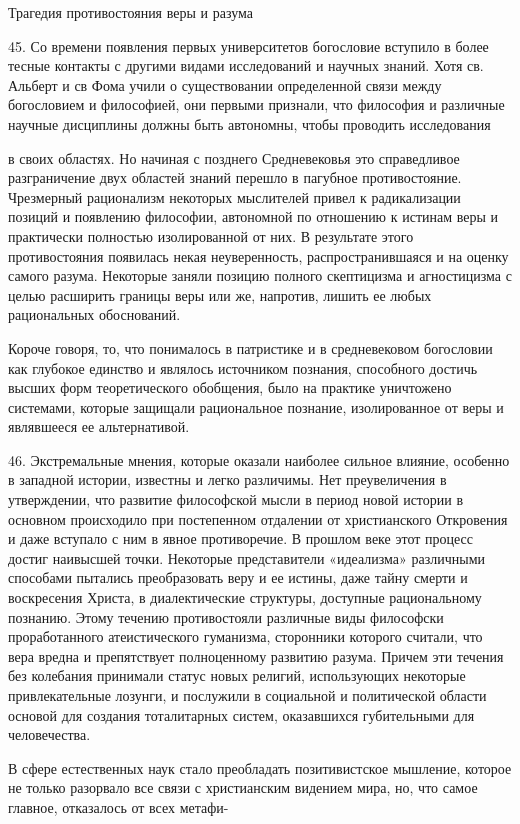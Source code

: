 \documentclass[a5paper,10pt]{article}
\begin{document}
Трагедия противостояния веры и разума

45. Со времени появления первых университетов богословие вступило в более
тесные контакты с другими видами исследований и научных знаний. Хотя св.
Альберт и св Фома учили о существовании определенной связи между богословием и
философией, они первыми признали, что философия и различные научные дисциплины
должны быть автономны, чтобы проводить исследования

в своих областях. Но начиная с позднего Средневековья это справедливое
разграничение двух областей знаний перешло в пагубное противостояние.
Чрезмерный рационализм некоторых мыслителей привел к радикализации позиций и
появлению философии, автономной по отношению к истинам веры и практически
полностью изолированной от них. В результате этого противостояния появилась
некая неуверенность, распространившаяся и на оценку самого разума. Некоторые
заняли позицию полного скептицизма и агностицизма с целью расширить границы
веры или же, напротив, лишить ее любых рациональных обоснований.

Короче говоря, то, что понималось в патристике и в средневековом богословии как
глубокое единство и являлось источником познания, способного достичь высших
форм теоретического обобщения, было на практике уничтожено системами, которые
защищали рациональное познание, изолированное от веры и являвшееся ее
альтернативой.

46. Экстремальные мнения, которые оказали наиболее сильное влияние, особенно в
западной истории, известны и легко различимы. Нет преувеличения в утверждении,
что развитие философской мысли в период новой истории в основном происходило
при постепенном отдалении от христианского Откровения и даже вступало с ним в
явное противоречие. В прошлом веке этот процесс достиг наивысшей точки.
Некоторые представители «идеализма» различными способами пытались преобразовать
веру и ее истины, даже тайну смерти и воскресения Христа, в диалектические
структуры, доступные рациональному познанию. Этому течению противостояли
различные виды философски проработанного атеистического гуманизма, сторонники
которого считали, что вера вредна и препятствует полноценному развитию разума.
Причем эти течения без колебания принимали статус новых религий, использующих
некоторые привлекательные лозунги, и послужили в социальной и политической
области основой для создания тоталитарных систем, оказавшихся губительными для
человечества.

В сфере естественных наук стало преобладать позитивистское мышление, которое не
только разорвало все связи с христианским видением мира, но, что самое главное,
отказалось от всех метафи-
\end{document}
